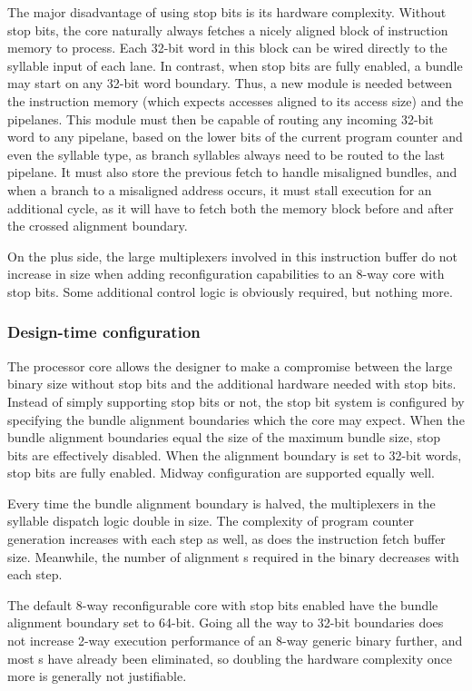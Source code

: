 The major disadvantage of using stop bits is its hardware complexity. Without 
stop bits, the core naturally always fetches a nicely aligned block of 
instruction memory to process. Each 32-bit word in this block can be wired 
directly to the syllable input of each lane. In contrast, when stop bits are 
fully enabled, a bundle may start on any 32-bit word boundary. Thus, a new 
module is needed between the instruction memory (which expects accesses aligned 
to its access size) and the pipelanes. This module must then be capable of 
routing any incoming 32-bit word to any pipelane, based on the lower bits of the 
current program counter and even the syllable type, as branch syllables always 
need to be routed to the last pipelane. It must also store the previous fetch to 
handle misaligned bundles, and when a branch to a misaligned address occurs, it 
must stall execution for an additional cycle, as it will have to fetch both the 
memory block before and after the crossed alignment boundary.

On the plus side, the large multiplexers involved in this instruction buffer do
not increase in size when adding reconfiguration capabilities to an 8-way core
with stop bits. Some additional control logic is obviously required, but nothing
more.

\subsubsection{Design-time configuration}
\label{ref:core-ug-isa-sbit-cfg}

The \rvex{} processor core allows the designer to make a compromise between the
large binary size without stop bits and the additional hardware needed with stop
bits. Instead of simply supporting stop bits or not, the stop bit system is
configured by specifying the bundle alignment boundaries which the core may
expect. When the bundle alignment boundaries equal the size of the maximum
bundle size, stop bits are effectively disabled. When the alignment boundary is
set to 32-bit words, stop bits are fully enabled. Midway configuration are
supported equally well.

Every time the bundle alignment boundary is halved, the multiplexers in the
syllable dispatch logic double in size. The complexity of program counter
generation increases with each step as well, as does the instruction fetch
buffer size. Meanwhile, the number of alignment s required in the
binary decreases with each step.

The default 8-way reconfigurable core with stop bits enabled have the bundle
alignment boundary set to 64-bit. Going all the way to 32-bit boundaries does
not increase 2-way execution performance of an 8-way generic binary further, and
most s have already been eliminated, so doubling the hardware
complexity once more is generally not justifiable.
